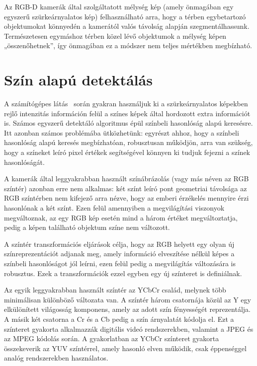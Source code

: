 \documentclass[12pt,a4paper,oneside]{report}             %
\begin{document}
Az RGB-D kamerák által szolgáltatott mélység kép (amely önmagában egy egyszerű szürkeárnyalatos kép) felhasználható arra, hogy a térben egybetartozó objektumokat könnyedén a kamerától valós távolság alapján szegmentálhassunk. Természetesen egymáshoz térben közel lévő objektumok a mélység képen „összenőhetnek”, így önmagában ez a módszer nem teljes mértékben megbízható.

\section{Szín alapú detektálás}

A számítógépes látás~\cite{szgl} során gyakran használjuk ki a szürkeárnyalatos képekben rejlő intenzitás információn felül a színes képek által hordozott extra információt is. Számos egyszerű detektáló algoritmus épül színbeli hasonlóság alapú keresésre. Itt azonban számos problémába ütközhetünk: egyrészt ahhoz, hogy a színbeli hasonlóság alapú keresés megbízhatóan, robusztusan működjön, arra van szükség, hogy a színeket leíró pixel értékek segítségével könnyen ki tudjuk fejezni a színek hasonlóságát. 

A kamerák által leggyakrabban használt színábrázolás (vagy más néven az RGB színtér) azonban erre nem alkalmas: két színt leíró pont geometriai távolsága az RGB színtérben nem kifejező arra nézve, hogy az emberi érzékelés mennyire érzi hasonlónak a két színt. Ezen felül amennyiben a megvilágítási viszonyok megváltoznak, az egy RGB kép esetén mind a három értéket megváltoztatja, pedig a képen található objektum színe nem változott.

A színtér transzformációs eljárások célja, hogy az RGB helyett egy olyan új színreprezentációt adjanak meg, amely információ elveszítése nélkül képes a színbeli hasonlóságot jól leírni, ezen felül pedig a megvilágítás változására is robusztus. Ezek a transzformációk ezzel egyben egy új színteret is definiálnak.

Az egyik leggyakrabban használt színtér az YCbCr család, melynek több minimálisan különböző változata van. A színtér három csatornája közül az Y egy elkülönített világosság komponens, amely az adott szín fényességét reprezentálja. A másik két csatorna a Cr és a Cb pedig a szín árnyalatát kódolja el. Ezt a színteret gyakorta alkalmazzák digitális videó rendszerekben, valamint a JPEG és az MPEG kódolás során. A gyakorlatban az YCbCr színteret gyakorta összekeverik az YUV színtérrel, amely hasonló elven működik, csak éppenséggel analóg rendszerekben használatos.
\end{document}
